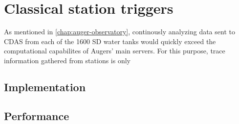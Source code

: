 
\chapter{Classical station triggers}
\label{chap:classical-triggers}

As mentioned in \autoref{chap:auger-observatory}, continously analyzing data sent to CDAS from each of the 1600 SD water tanks would quickly exceed the 
computational capabilites of Augers' main servers. For this purpose, trace information gathered from stations is only 

\section{Implementation}
\label{sec:hardware-triggers-implementation}

\section{Performance}
\label{sec:hardware-triggers-performance}




